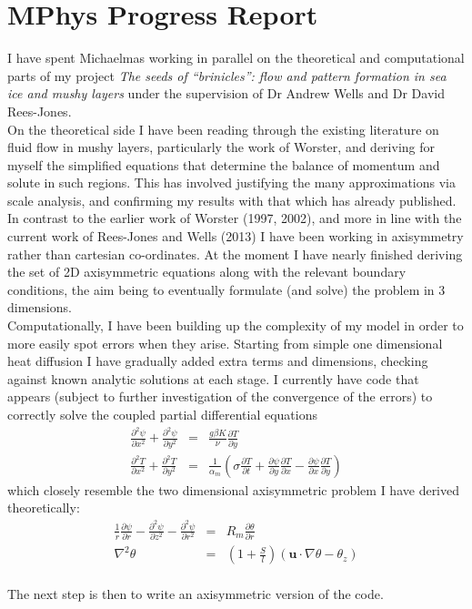 \documentclass{article}
\begin{document}
 
\section*{MPhys Progress Report}
I have spent Michaelmas working in parallel on the theoretical and computational parts of my project \textit{The seeds of “brinicles”: flow and pattern formation in sea ice and mushy layers} under the supervision of Dr Andrew Wells and Dr David Rees-Jones. \\

On the theoretical side I have been reading through the existing literature on fluid flow in mushy layers, particularly the work of Worster, and deriving for myself the simplified equations that determine the balance of momentum and solute in such regions. This has involved justifying the many approximations via scale analysis, and confirming my results with that which has already published. In contrast to the earlier work of Worster (1997, 2002), and more in line with the current work of Rees-Jones and Wells (2013) I have been working in axisymmetry rather than cartesian co-ordinates. At the moment I have nearly finished deriving the set of 2D axisymmetric equations along with the relevant boundary conditions, the aim being to eventually formulate (and solve) the problem in 3 dimensions. \\

Computationally, I have been building up the complexity of my model in order to more easily spot errors when they arise. Starting from simple one dimensional heat diffusion I have gradually added extra terms and dimensions, checking against known analytic solutions at each stage. I currently have code that appears (subject to further investigation of the convergence of the errors) to correctly solve the coupled partial differential equations
\begin{eqnarray}
\frac{\partial^2 \psi}{\partial x^2} + \frac{\partial^2 \psi}{\partial y^2} &=& \frac{g \beta K}{\nu} \frac{\partial T}{\partial y} \\
\frac{\partial^2 T}{\partial x^2} + \frac{\partial^2 T}{\partial y^2} &=& \frac{1}{\alpha_m} \left( \sigma \frac{\partial T}{\partial t} + \frac{\partial \psi}{\partial y} \frac{\partial T}{\partial x} - \frac{\partial \psi}{\partial x} \frac{\partial T}{\partial y} \right)
\end{eqnarray}
which closely resemble the two dimensional axisymmetric problem I have derived theoretically:
\begin{eqnarray}
\frac{1}{r} \frac{\partial \psi}{\partial r}   - \frac{\partial^2 \psi}{\partial z^2} - \frac{\partial^2 \psi}{\partial r^2} &=& R_m \frac{\partial \theta}{\partial r} \\
\nabla^2 \theta &=& \left(1 + \frac{S}{l} \right) (\mathbf{u} \cdot \nabla \theta - \theta_z )
\end{eqnarray}
 \\

The next step is then to write an axisymmetric version of the code.
\end{document}

